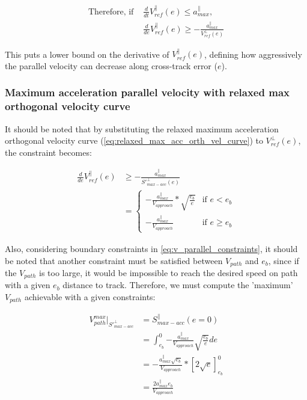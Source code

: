 \begin{equation}
\begin{split}
    \text{Therefore, if } &\frac{d}{dt}V_{ref}^{\parallel}(e) \leq a^{\parallel}_{max},\\
    &\frac{d}{de}V_{ref}^{\parallel}(e) \geq -\frac{a^{\parallel}_{max}}{V_{ref}^{\perp}(e)}
\end{split}
\end{equation}

This puts a lower bound on the derivative of $V_{ref}^{\parallel}(e)$, defining how aggressively the parallel velocity can decrease along cross-track error ($e$).\newline

\subsubsection{Maximum acceleration parallel velocity with relaxed max orthogonal velocity curve}
It should be noted that by substituting the relaxed maximum acceleration orthogonal velocity curve (\autoref{eq:relaxed_max_acc_orth_vel_curve}) to $V^{\perp}_{ref}(e)$, the constraint becomes:

\begin{equation}
\begin{split}
    \frac{d}{de}V_{ref}^{\parallel}(e) &\geq -\frac{a^{\parallel}_{max}}{{S'}^{\perp}_{max-acc}(e)}\\
    &=\begin{cases}
        -\frac{a^{\parallel}_{max}}{V_{approach}} * \sqrt{\frac{e_b}{e}}& \text{if $e < e_b$}\\
        -\frac{a^{\parallel}_{max}}{V_{approach}}& \text{if $e \geq e_b$}
    \end{cases}
\end{split}
\end{equation}

Also, considering boundary constraints in \autoref{eq:v_parallel_constraints}, it should be noted that another constraint must be satisfied between $V_{path}$ and $e_b$, since if the $V_{path}$ is too large, it would be impossible to reach the desired speed on path with a given $e_b$ distance to track. Therefore, we must compute the 'maximum' $V_{path}$ achievable with a given constraints:

\begin{equation}
    \begin{split}
        V_{path}^{max} |_{S'^{\perp}_{max-acc}} &= S^{\parallel}_{max-acc}(e=0)\\
        &= \int^{0}_{e_b}{-\frac{a^{\parallel}_{max}}{V_{approach}}\sqrt{\frac{e_b}{e}}} de\\
        &= -\frac{a^{\parallel}_{max}\sqrt{e_b}}{V_{approach}} * [2\sqrt{e}]^{0}_{e_b}\\
        &= \frac{2a^{\parallel}_{max}e_b}{V_{approach}}
    \end{split}
    \label{eq:max_path_speed_with_relaxed_orthog_speed_max_acc}
\end{equation}

